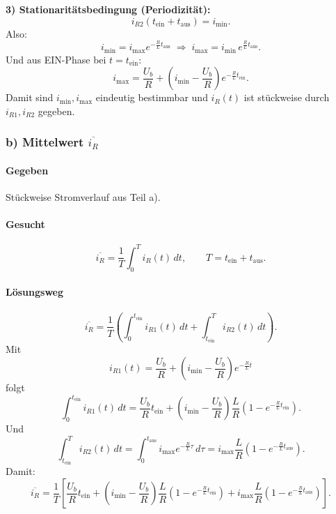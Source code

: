 \textbf{3) Stationaritätsbedingung (Periodizität):}
\[
i_{R2}(t_\mathrm{ein}+t_\mathrm{aus}) = i_\mathrm{min}.
\]
Also:
\[
i_\mathrm{min}=i_\mathrm{max}e^{-\frac{R}{L}t_\mathrm{aus}}
\;\Rightarrow\;
\boxed{
i_\mathrm{max}=i_\mathrm{min}\,e^{\frac{R}{L}t_\mathrm{aus}}
}.
\]
Und aus EIN-Phase bei $t=t_\mathrm{ein}$:
\[
i_\mathrm{max}=\frac{U_b}{R}+\left(i_\mathrm{min}-\frac{U_b}{R}\right)e^{-\frac{R}{L}t_\mathrm{ein}}.
\]
Damit sind $i_\mathrm{min},i_\mathrm{max}$ eindeutig bestimmbar und $i_R(t)$ ist stückweise durch $i_{R1},i_{R2}$ gegeben.



\subsubsection*{b) Mittelwert $\overline{i_R}$}

\paragraph{Gegeben}
Stückweise Stromverlauf aus Teil a).

\paragraph{Gesucht}
\[
\overline{i_R}=\frac{1}{T}\int_0^T i_R(t)\,dt, \qquad T=t_\mathrm{ein}+t_\mathrm{aus}.
\]

\paragraph{Lösungsweg}
\[
\overline{i_R}=\frac{1}{T}\left(
\int_0^{t_\mathrm{ein}} i_{R1}(t)\,dt + \int_{t_\mathrm{ein}}^{T} i_{R2}(t)\,dt
\right).
\]
Mit
\[
i_{R1}(t)=\frac{U_b}{R}+\left(i_\mathrm{min}-\frac{U_b}{R}\right)e^{-\frac{R}{L}t}
\]
folgt
\[
\int_0^{t_\mathrm{ein}} i_{R1}(t)\,dt
=
\frac{U_b}{R}t_\mathrm{ein}
+
\left(i_\mathrm{min}-\frac{U_b}{R}\right)\frac{L}{R}\left(1-e^{-\frac{R}{L}t_\mathrm{ein}}\right).
\]
Und
\[
\int_{t_\mathrm{ein}}^{T} i_{R2}(t)\,dt
=
\int_0^{t_\mathrm{aus}} i_\mathrm{max}e^{-\frac{R}{L}\tau}\,d\tau
=
i_\mathrm{max}\frac{L}{R}\left(1-e^{-\frac{R}{L}t_\mathrm{aus}}\right).
\]
Damit:
\[
\boxed{
\overline{i_R}=\frac{1}{T}\left[
\frac{U_b}{R}t_\mathrm{ein}
+
\left(i_\mathrm{min}-\frac{U_b}{R}\right)\frac{L}{R}\left(1-e^{-\frac{R}{L}t_\mathrm{ein}}\right)
+
i_\mathrm{max}\frac{L}{R}\left(1-e^{-\frac{R}{L}t_\mathrm{aus}}\right)
\right].
}
\]



